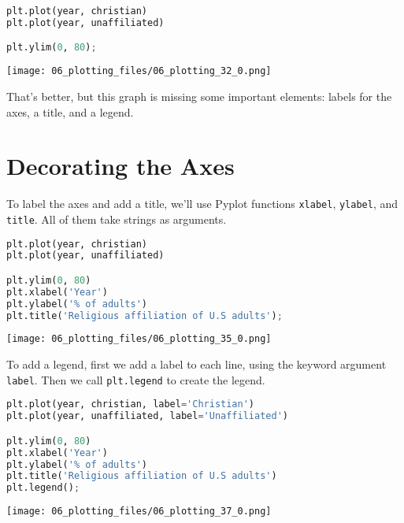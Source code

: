 \begin{lstlisting}[language=Python,style=source]
plt.plot(year, christian)
plt.plot(year, unaffiliated)

plt.ylim(0, 80);
\end{lstlisting}

\begin{center}
\texttt{[image: 06\_plotting\_files/06\_plotting\_32\_0.png]}
\end{center}

That's better, but this graph is missing some important elements: labels
for the axes, a title, and a legend.

\section{Decorating the Axes}\label{decorating-the-axes}

To label the axes and add a title, we'll use Pyplot functions
\passthrough{\lstinline!xlabel!}, \passthrough{\lstinline!ylabel!}, and
\passthrough{\lstinline!title!}. All of them take strings as arguments.

\begin{lstlisting}[language=Python,style=source]
plt.plot(year, christian)
plt.plot(year, unaffiliated)

plt.ylim(0, 80)
plt.xlabel('Year')
plt.ylabel('% of adults')
plt.title('Religious affiliation of U.S adults');
\end{lstlisting}

\begin{center}
\texttt{[image: 06\_plotting\_files/06\_plotting\_35\_0.png]}
\end{center}

To add a legend, first we add a label to each line, using the keyword
argument \passthrough{\lstinline!label!}. Then we call
\passthrough{\lstinline!plt.legend!} to create the legend.

\begin{lstlisting}[language=Python,style=source]
plt.plot(year, christian, label='Christian')
plt.plot(year, unaffiliated, label='Unaffiliated')

plt.ylim(0, 80)
plt.xlabel('Year')
plt.ylabel('% of adults')
plt.title('Religious affiliation of U.S adults')
plt.legend();
\end{lstlisting}

\begin{center}
\texttt{[image: 06\_plotting\_files/06\_plotting\_37\_0.png]}
\end{center}

